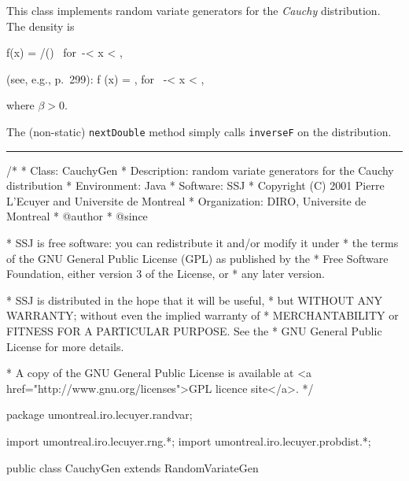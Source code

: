 
This class implements random variate generators for the {\em Cauchy\/} 
distribution. The density is
\begin{htmlonly}%
\eq
  f(x) = \beta/()
\mbox{ for }-\infty < x < \infty,
\endeq
\end{htmlonly}%
\begin{latexonly}%
(see, e.g., \cite {tJOH95a} p.\ 299):
\eq 
    f (x) = ,
             \qquad  \mbox{for } -\infty < x < \infty, 
\endeq
\end{latexonly}
where $\beta > 0$.

The (non-static) \texttt{nextDouble} method simply calls 
\texttt{inverseF} on the distribution.

\bigskip\hrule

\begin{code}
\begin{hide}
/*
 * Class:        CauchyGen
 * Description:  random variate generators for the Cauchy distribution
 * Environment:  Java
 * Software:     SSJ 
 * Copyright (C) 2001  Pierre L'Ecuyer and Universite de Montreal
 * Organization: DIRO, Universite de Montreal
 * @author       
 * @since

 * SSJ is free software: you can redistribute it and/or modify it under
 * the terms of the GNU General Public License (GPL) as published by the
 * Free Software Foundation, either version 3 of the License, or
 * any later version.

 * SSJ is distributed in the hope that it will be useful,
 * but WITHOUT ANY WARRANTY; without even the implied warranty of
 * MERCHANTABILITY or FITNESS FOR A PARTICULAR PURPOSE.  See the
 * GNU General Public License for more details.

 * A copy of the GNU General Public License is available at
   <a href="http://www.gnu.org/licenses">GPL licence site</a>.
 */
\end{hide}
package umontreal.iro.lecuyer.randvar;\begin{hide}
import umontreal.iro.lecuyer.rng.*;
import umontreal.iro.lecuyer.probdist.*;
\end{hide}

public class CauchyGen extends RandomVariateGen \begin{hide} {
   protected double alpha;
   protected double beta;
\end{hide}
\end{code}

